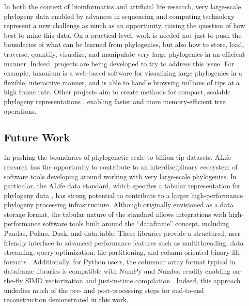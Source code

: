 In both the context of bioinformatics and artificial life research, very large-scale phylogeny data enabled by advances in sequencing and computing technology represent a new challenge as much as an opportunity, raising the question of how best to mine this data.
On a practical level, work is needed not just to push the boundaries of what can be learned from phylogenies, but also how to store, load, traverse, quantify, visualize, and manipulate very large phylogenies in an efficient manner.
Indeed, projects are being developed to try to address this issue.
For example, taxonium \citep{sanderson2022taxonium} is a web-based software for visualizing large phylogenies in a flexible, interactive manner, and is able to handle browsing millions of tips at a high frame rate.
Other projects aim to create methods for compact, scalable phylogeny representations \citep{moshiri2025compacttree, moshiri2020treeswift}, enabling faster and more memory-efficient tree operations.

\subsection{Future Work}

In pushing the boundaries of phylogenetic scale to billion-tip datasets, ALife research has the opportunity to contribute to an interdisciplinary ecosystem of software tools developing around working with very large-scale phylogenies.
In particular, the ALife data standard, which specifies a tabular representation for phylogeny data \citep{Lalejini2019data}, has strong potential to contribute to a larger high-performance phylogeny processing infrastructure.
Although originally envisioned as a data storage format, the tabular nature of the standard allows integrations with high-performance software tools built around the ``dataframe'' concept, including Pandas, Polars, Dask, and data.table.
These libraries provide a structured, user-friendly interface to advanced performance features such as multithreading, data streaming, query optimization, file partitioning, and column-oriented binary file formats \citep{mckinney2010data,datatable,vink2024polars,rocklin2015dask}.
Additionally, for Python users, the columnar array format typical in dataframe libraries is compatible with NumPy and Numba, readily enabling on-the-fly SIMD vectorization and just-in-time compilation \citep{harris2020array,lam2015numba}.
Indeed, this approach underlies much of the pre- and post-processing steps for end-to-end reconstruction demonstrated in this work.


